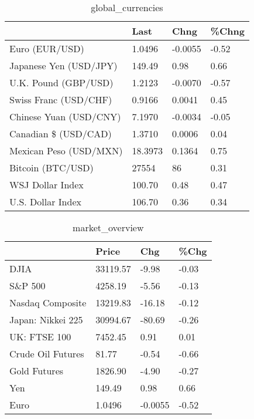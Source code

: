 \documentclass{article}%
\begin{document}
%


\begin{table}[htbp]%
\caption{global\_currencies}%
\centering%
\begin{adjustbox}{width=1\textwidth}%
\begin{tabular}{llll}
\toprule
                       &    Last &    Chng & \%Chng \\
\midrule
        Euro (EUR/USD) &  1.0496 & -0.0055 & -0.52 \\
Japanese Yen (USD/JPY) &  149.49 &    0.98 &  0.66 \\
  U.K. Pound (GBP/USD) &  1.2123 & -0.0070 & -0.57 \\
 Swiss Franc (USD/CHF) &  0.9166 &  0.0041 &  0.45 \\
Chinese Yuan (USD/CNY) &  7.1970 & -0.0034 & -0.05 \\
  Canadian \$ (USD/CAD) &  1.3710 &  0.0006 &  0.04 \\
Mexican Peso (USD/MXN) & 18.3973 &  0.1364 &  0.75 \\
     Bitcoin (BTC/USD) &   27554 &      86 &  0.31 \\
      WSJ Dollar Index &  100.70 &    0.48 &  0.47 \\
     U.S. Dollar Index &  106.70 &    0.36 &  0.34 \\
\bottomrule
\end{tabular}
%
\end{adjustbox}%
\end{table}

%


\begin{table}[htbp]%
\caption{market\_overview}%
\centering%
\begin{adjustbox}{width=1\textwidth}%
\begin{tabular}{llll}
\toprule
                  &    Price &     Chg &  \%Chg \\
\midrule
             DJIA & 33119.57 &   -9.98 & -0.03 \\
          S\&P 500 &  4258.19 &   -5.56 & -0.13 \\
 Nasdaq Composite & 13219.83 &  -16.18 & -0.12 \\
Japan: Nikkei 225 & 30994.67 &  -80.69 & -0.26 \\
     UK: FTSE 100 &  7452.45 &    0.91 &  0.01 \\
Crude Oil Futures &    81.77 &   -0.54 & -0.66 \\
     Gold Futures &  1826.90 &   -4.90 & -0.27 \\
              Yen &   149.49 &    0.98 &  0.66 \\
             Euro &   1.0496 & -0.0055 & -0.52 \\
\bottomrule
\end{tabular}
%
\end{adjustbox}%
\end{table}

%
\end{document}
